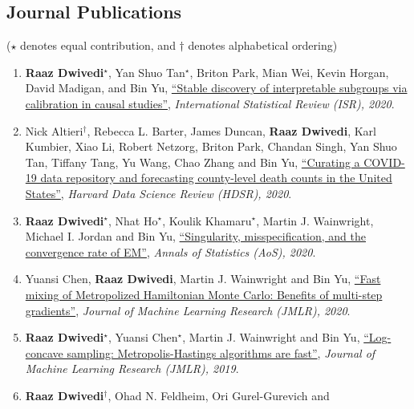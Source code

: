 \documentclass[margin,centered]{res}
\begin{document}
\begin{resume}
\newcommand{\eqc}{$^{\star}$}
\newcommand{\alpo}{$^{\dagger}$}
\newcommand{\vsep}{\vspace{-.07in}}
\newcommand{\ptitle}[1]{``#1''}

\section{\sc Journal Publications}
{\footnotesize{($\star$ denotes equal contribution, and  $\dagger$ denotes
alphabetical
ordering)}
}


\begin{enumerate}[label={J\arabic*.},leftmargin=*]
\item\label{mala_jmlr} \textbf{Raaz Dwivedi}\eqc, Yan  Shuo Tan\eqc, Briton Park, Mian Wei,
Kevin Horgan, David Madigan,  and Bin Yu, 
\href{https://arxiv.org/pdf/2008.10109.pdf}
{\ptitle{Stable discovery of interpretable subgroups via
calibration in causal studies}}, \textit{International Statistical
Review (ISR), 2020}.
\item Nick Altieri\alpo, Rebecca L. Barter, James Duncan, \textbf{Raaz Dwivedi},
Karl Kumbier, Xiao Li, Robert Netzorg, Briton Park, Chandan Singh, Yan Shuo
Tan, Tiffany Tang, Yu Wang, Chao Zhang and Bin Yu, \href{https://hdsr.mitpress.mit.edu/pub/p6isyf0g/release/4}
{\ptitle{Curating a COVID-19 data repository
and forecasting county-level death counts in the United States}}, \emph{Harvard Data Science Review (HDSR), 2020}.
\item \textbf{Raaz Dwivedi}\eqc, Nhat Ho\eqc, Koulik Khamaru\eqc, Martin J.
Wainwright,
Michael I. Jordan and Bin Yu, \href{https://arxiv.org/pdf/1810.00828.pdf}
{\ptitle{Singularity, misspecification, and the convergence rate of EM}},
\emph{Annals of Statistics (AoS), 2020}.
\item Yuansi Chen, \textbf{Raaz Dwivedi}, Martin
J. Wainwright and Bin Yu, 
\href{https://www.jmlr.org/papers/volume21/19-441/19-441.pdf}{\ptitle{Fast
mixing of Metropolized Hamiltonian Monte Carlo: Benefits of multi-step gradients}}, \emph{Journal of Machine Learning Research (JMLR), 2020}.
\item \textbf{Raaz Dwivedi}\eqc, Yuansi Chen\eqc, Martin
J. Wainwright and Bin Yu, \href{https://jmlr.csail.mit.edu/papers/volume20/19-306/19-306.pdf}
{\ptitle{Log-concave sampling: Metropolis-Hastings algorithms are fast}}, \emph{Journal of Machine Learning Research (JMLR), 2019}.
\item \textbf{Raaz Dwivedi}\alpo, Ohad N. Feldheim, Ori Gurel-Gurevich and

\end{enumerate}
\end{resume}
\end{document}
